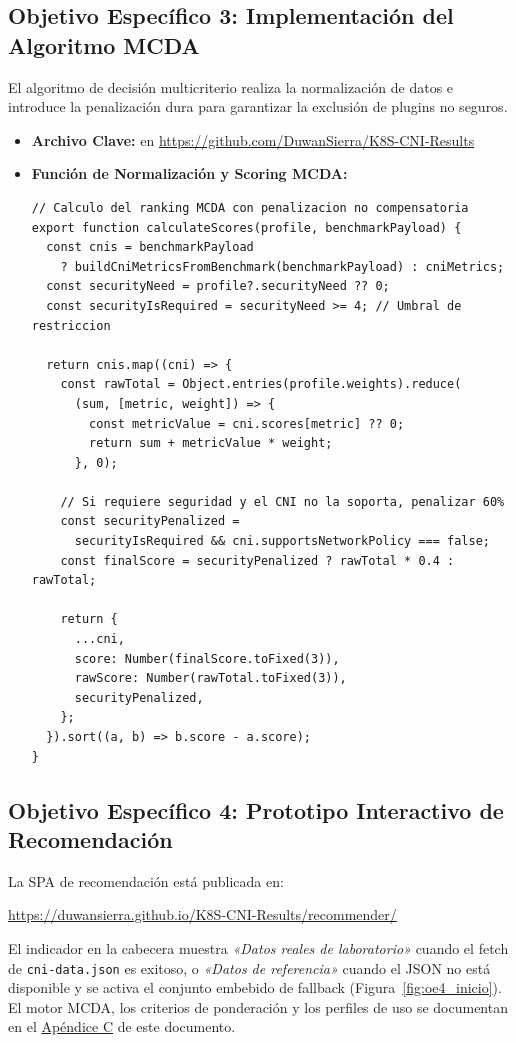 \subsection{Objetivo Específico 3: Implementación del Algoritmo MCDA}

El algoritmo de decisión multicriterio realiza la normalización de
datos e introduce la penalización dura para garantizar la exclusión
de plugins no seguros.

\begin{itemize}
    \item \textbf{Archivo Clave:}
          en \url{https://github.com/DuwanSierra/K8S-CNI-Results}
    \item \textbf{Función de Normalización y Scoring MCDA:}
\begin{lstlisting}
// Calculo del ranking MCDA con penalizacion no compensatoria
export function calculateScores(profile, benchmarkPayload) {
  const cnis = benchmarkPayload
    ? buildCniMetricsFromBenchmark(benchmarkPayload) : cniMetrics;
  const securityNeed = profile?.securityNeed ?? 0;
  const securityIsRequired = securityNeed >= 4; // Umbral de restriccion

  return cnis.map((cni) => {
    const rawTotal = Object.entries(profile.weights).reduce(
      (sum, [metric, weight]) => {
        const metricValue = cni.scores[metric] ?? 0;
        return sum + metricValue * weight;
      }, 0);

    // Si requiere seguridad y el CNI no la soporta, penalizar 60%
    const securityPenalized =
      securityIsRequired && cni.supportsNetworkPolicy === false;
    const finalScore = securityPenalized ? rawTotal * 0.4 : rawTotal;

    return {
      ...cni,
      score: Number(finalScore.toFixed(3)),
      rawScore: Number(rawTotal.toFixed(3)),
      securityPenalized,
    };
  }).sort((a, b) => b.score - a.score);
}
\end{lstlisting}
\end{itemize}

\subsection{Objetivo Específico 4: Prototipo Interactivo de Recomendación}

La SPA de recomendación está publicada en:
\begin{center}
\small\url{https://duwansierra.github.io/K8S-CNI-Results/recommender/}
\end{center}
El indicador en la cabecera muestra \emph{«Datos reales de laboratorio»}
cuando el fetch de \texttt{cni-data.json} es exitoso, o
\emph{«Datos de referencia»} cuando el JSON no está disponible y se
activa el conjunto embebido de fallback
(Figura~\ref{fig:oe4_inicio}).
El motor MCDA, los criterios de ponderación y los perfiles de uso
se documentan en el
\hyperref[chap:apendice_oe3]{Apéndice C} de este documento.

